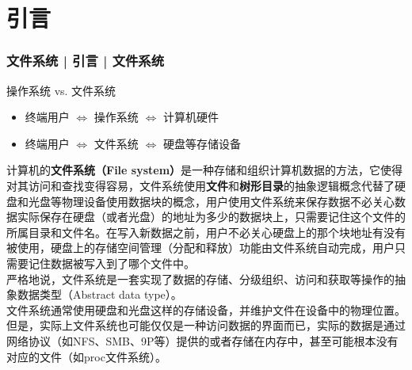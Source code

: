 \section{引言}
\begin{frame}
  \frametitle{文件系统 | 引言 | 文件系统}
  \vspace{-1em}
\begin{block}{操作系统 vs. 文件系统}
\begin{itemize}
  \item 终端用户 $\Longleftrightarrow$ 操作系统 $\Longleftrightarrow$ 计算机硬件
  \item 终端用户 $\Longleftrightarrow$ 文件系统 $\Longleftrightarrow$ 硬盘等存储设备
\end{itemize}
\end{block}
\pause
  \footnotesize{
  计算机的\textbf{文件系统（File system）}是一种存储和组织计算机数据的方法，它使得对其访问和查找变得容易，文件系统使用\textbf{文件}和\textbf{树形目录}的抽象逻辑概念代替了硬盘和光盘等物理设备使用数据块的概念，用户使用文件系统来保存数据不必关心数据实际保存在硬盘（或者光盘）的地址为多少的数据块上，只需要记住这个文件的所属目录和文件名。在写入新数据之前，用户不必关心硬盘上的那个块地址有没有被使用，硬盘上的存储空间管理（分配和释放）功能由文件系统自动完成，用户只需要记住数据被写入到了哪个文件中。\\
  \vspace{0.1cm}
严格地说，文件系统是一套实现了数据的存储、分级组织、访问和获取等操作的抽象数据类型（Abstract data type）。\\
  \vspace{0.1cm}
文件系统通常使用硬盘和光盘这样的存储设备，并维护文件在设备中的物理位置。但是，实际上文件系统也可能仅仅是一种访问数据的界面而已，实际的数据是通过网络协议（如NFS、SMB、9P等）提供的或者存储在内存中，甚至可能根本没有对应的文件（如proc文件系统）。
}
\end{frame}

